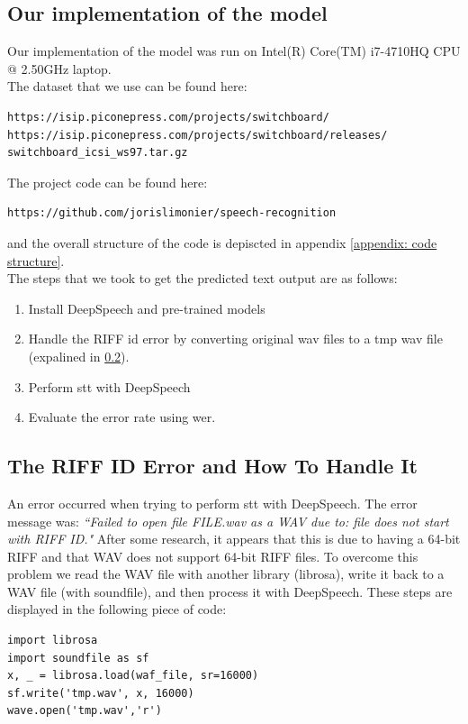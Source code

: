 \documentclass[12pt]{article}
\begin{document}
\subsection{Our implementation of the model}
Our implementation of the model was run on Intel(R) Core(TM) i7-4710HQ CPU @ 2.50GHz laptop. \\
The dataset that we use can be found here:
\begin{verbatim}
https://isip.piconepress.com/projects/switchboard/
https://isip.piconepress.com/projects/switchboard/releases/
switchboard_icsi_ws97.tar.gz
\end{verbatim}
The project code can be found here:
\begin{verbatim}
https://github.com/jorislimonier/speech-recognition
\end{verbatim}
and the overall structure of the code is depiscted in appendix \ref{appendix: code structure}. \\
The steps that we took to get the predicted text output are as follows:
\begin{enumerate}
    \item Install DeepSpeech and pre-trained models
    \item Handle the RIFF id error by converting original wav files to a tmp wav file (expalined in \ref{riff error}).
    \item Perform \gls{stt} with DeepSpeech
    \item Evaluate the error rate using \gls{wer}.
\end{enumerate}

\subsection{The RIFF ID Error and How To Handle It}
\label{riff error}
An error occurred when trying to perform \gls{stt} with DeepSpeech. The error message was: \textit{ ``Failed to open file FILE.wav as a WAV due to: file does not start with RIFF ID."} After some research, it appears that this is due to having a 64-bit RIFF and that WAV does not support 64-bit RIFF files. To overcome this problem we read the WAV file with another library (librosa), write it back to a  WAV file (with soundfile), and then process it with DeepSpeech. These steps are displayed in the following piece of code:
\begin{verbatim}
import librosa
import soundfile as sf
x, _ = librosa.load(waf_file, sr=16000)
sf.write('tmp.wav', x, 16000)
wave.open('tmp.wav','r')
\end{verbatim}
\end{document}
